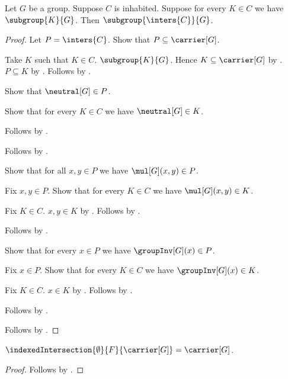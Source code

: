\begin{theorem}\label{subgroup_family_intersection}
    Let $G$ be a group.
    Suppose $C$ is inhabited.
    Suppose for every $K\in C$ we have $\subgroup{K}{G}$.
    Then $\subgroup{\inters{C}}{G}$.
\end{theorem}
\begin{proof}
    Let $P=\inters{C}$.
    Show that $P\subseteq\carrier[G]$.
    \begin{subproof}
        Take $K$ such that $K\in C$.
        $\subgroup{K}{G}$.
        Hence $K\subseteq\carrier[G]$ by
            .
        $P\subseteq K$ by .
        Follows by .
    \end{subproof}
    Show that $\neutral[G]\in P$.
    \begin{subproof}
        Show that for every $K\in C$ we have $\neutral[G]\in K$.
        \begin{subproof}
            Follows by .
        \end{subproof}
        Follows by .
    \end{subproof}
    Show that for all $x,y\in P$ we have $\mul[G](x,y)\in P$.
    \begin{subproof}
        Fix $x,y\in P$.
        Show that for every $K\in C$ we have $\mul[G](x,y)\in K$.
        \begin{subproof}
            Fix $K\in C$.
            $x,y\in K$ by .
            Follows by .
        \end{subproof}
        Follows by .
    \end{subproof}
    Show that for every $x\in P$ we have $\groupInv[G](x)\in P$.
    \begin{subproof}
        Fix $x\in P$.
        Show that for every $K\in C$ we have $\groupInv[G](x)\in K$.
        \begin{subproof}
            Fix $K\in C$.
            $x\in K$ by .
            Follows by .
        \end{subproof}
        Follows by .
    \end{subproof}
    Follows by .
\end{proof}

\begin{proposition}\label{empty_indexed_intersection_is_full_carrier}
    $\indexedIntersection{\emptyset}{F}{\carrier[G]}
        =\carrier[G]$.
\end{proposition}
\begin{proof}
    Follows by .
\end{proof}

